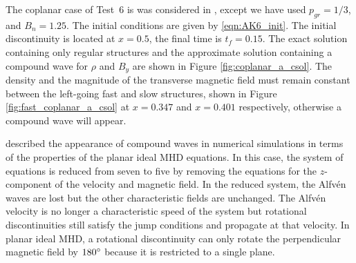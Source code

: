 The coplanar case of Test~6 is was considered in \citep{Ryu:1995a}, except we have used $p_{gr} = 1/3$, and $B_n = 1.25$.  The initial conditions are given by \eqref{eqn:AK6_init}.  The initial discontinuity is located at $x=0.5$, the final time is $t_f = 0.15$.  The exact solution containing only regular structures and the approximate solution containing a compound wave for $\rho$ and $B_y$ are shown in Figure \ref{fig:coplanar_a_csol}.  The density and the magnitude of the transverse magnetic field must remain constant between the left-going fast and slow structures, shown in Figure \ref{fig:fast_coplanar_a_csol} at $x=0.347$ and $x=0.401$ respectively, otherwise a compound wave will appear.  

\citet{Falle:2001} described the appearance of compound waves in numerical simulations in terms of the properties of the planar ideal MHD equations.  In this case, the system of equations is reduced from seven to five by removing the equations for the $z$-component of the velocity and magnetic field.  In the reduced system, the Alfv{\'e}n waves are lost but the other characteristic fields are unchanged.  The Alfv{\'e}n velocity is no longer a characteristic speed of the system but rotational discontinuities still satisfy the jump conditions and propagate at that velocity. In planar ideal MHD, a rotational discontinuity can only rotate the perpendicular magnetic field by $180^\circ$ because it is restricted to a single plane.     

